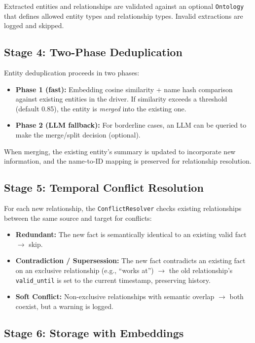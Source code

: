 \documentclass[11pt,twocolumn]{article}
\begin{document}
Extracted entities and relationships are validated against an optional \texttt{Ontology} that defines allowed entity types and relationship types. Invalid extractions are logged and skipped.

\subsection{Stage 4: Two-Phase Deduplication}

Entity deduplication proceeds in two phases:
\begin{itemize}[nosep]
  \item \textbf{Phase 1 (fast):} Embedding cosine similarity + name hash comparison against existing entities in the driver. If similarity exceeds a threshold (default 0.85), the entity is \emph{merged} into the existing one.
  \item \textbf{Phase 2 (LLM fallback):} For borderline cases, an LLM can be queried to make the merge/split decision (optional).
\end{itemize}

When merging, the existing entity's summary is updated to incorporate new information, and the name-to-ID mapping is preserved for relationship resolution.

\subsection{Stage 5: Temporal Conflict Resolution}

For each new relationship, the \texttt{ConflictResolver} checks existing relationships between the same source and target for conflicts:

\begin{itemize}[nosep]
  \item \textbf{Redundant:} The new fact is semantically identical to an existing valid fact $\rightarrow$ skip.
  \item \textbf{Contradiction / Supersession:} The new fact contradicts an existing fact on an exclusive relationship (e.g., ``works at'') $\rightarrow$ the old relationship's \texttt{valid\_until} is set to the current timestamp, preserving history.
  \item \textbf{Soft Conflict:} Non-exclusive relationships with semantic overlap $\rightarrow$ both coexist, but a warning is logged.
\end{itemize}

\subsection{Stage 6: Storage with Embeddings}
\end{document}
